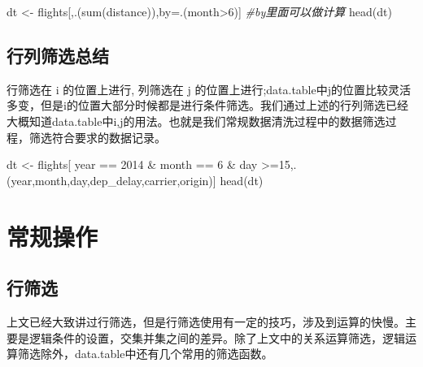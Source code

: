 \documentclass[
]{book}
\newenvironment{Shaded}{\begin{snugshade}}{\end{snugshade}}
\newcommand{\CommentTok}[1]{\textcolor[rgb]{0.56,0.35,0.01}{\textit{#1}}}
\newcommand{\DecValTok}[1]{\textcolor[rgb]{0.00,0.00,0.81}{#1}}
\newcommand{\FunctionTok}[1]{\textcolor[rgb]{0.00,0.00,0.00}{#1}}
\newcommand{\NormalTok}[1]{#1}
\newcommand{\OtherTok}[1]{\textcolor[rgb]{0.56,0.35,0.01}{#1}}
\newcommand{\SpecialCharTok}[1]{\textcolor[rgb]{0.00,0.00,0.00}{#1}}
\begin{document}
\begin{Shaded}
\begin{Highlighting}[]
\NormalTok{dt }\OtherTok{\textless{}{-}}\NormalTok{ flights[,.(}\FunctionTok{sum}\NormalTok{(distance)),by}\OtherTok{=}\NormalTok{.(month}\SpecialCharTok{\textgreater{}}\DecValTok{6}\NormalTok{)] }\CommentTok{\#by里面可以做计算}
\FunctionTok{head}\NormalTok{(dt)}
\end{Highlighting}
\end{Shaded}

\hypertarget{ux884cux5217ux7b5bux9009ux603bux7ed3}{%
\subsection{行列筛选总结}\label{ux884cux5217ux7b5bux9009ux603bux7ed3}}

行筛选在 i 的位置上进行, 列筛选在 j 的位置上进行;data.table中j的位置比较灵活多变，但是i的位置大部分时候都是进行条件筛选。我们通过上述的行列筛选已经大概知道data.table中i,j的用法。也就是我们常规数据清洗过程中的数据筛选过程，筛选符合要求的数据记录。

\begin{Shaded}
\begin{Highlighting}[]

\NormalTok{dt }\OtherTok{\textless{}{-}}\NormalTok{ flights[ year }\SpecialCharTok{==} \DecValTok{2014} \SpecialCharTok{\&}\NormalTok{ month }\SpecialCharTok{==} \DecValTok{6} \SpecialCharTok{\&}\NormalTok{ day }\SpecialCharTok{\textgreater{}=}\DecValTok{15}\NormalTok{,.(year,month,day,dep\_delay,carrier,origin)] }
\FunctionTok{head}\NormalTok{(dt)}
\end{Highlighting}
\end{Shaded}

\hypertarget{ux5e38ux89c4ux64cdux4f5c}{%
\section{常规操作}\label{ux5e38ux89c4ux64cdux4f5c}}

\hypertarget{ux884cux7b5bux9009}{%
\subsection{行筛选}\label{ux884cux7b5bux9009}}

上文已经大致讲过行筛选，但是行筛选使用有一定的技巧，涉及到运算的快慢。主要是逻辑条件的设置，交集并集之间的差异。除了上文中的关系运算筛选，逻辑运算筛选除外，data.table中还有几个常用的筛选函数。
\end{document}

